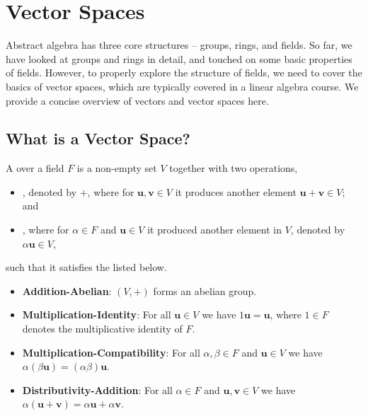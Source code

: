 \chapter{Vector Spaces}
Abstract algebra has three core structures -- groups, rings, and fields. So far, we have looked at groups and rings in detail, and touched on some basic properties of fields. However, to properly explore the structure of fields, we need to cover the basics of vector spaces, which are typically covered in a linear algebra course. We provide a concise overview of vectors and vector spaces here.

\section{What is a Vector Space?}
\begin{definition}
    A  over a field $F$ is a non-empty set $V$ together with two operations,
    \begin{itemize}
        \item {}, denoted by $+$, where for $\textbf{u}, \textbf{v} \in V$ it produces another element $\textbf{u} + \textbf{v} \in V$; and
        \item {}, where for $\alpha \in F$ and $\textbf{u} \in V$ it produced another element in $V$, denoted by $\alpha\textbf{u} \in V$,
    \end{itemize}
    such that it satisfies the  listed below.
    \begin{itemize}
        \item \textbf{Addition-Abelian}: $(V, +)$ forms an abelian group.

        \item \textbf{Multiplication-Identity}: For all $\textbf{u} \in V$ we have $1\textbf{u} = \textbf{u}$, where $1 \in F$ denotes the multiplicative identity of $F$.

        \item \textbf{Multiplication-Compatibility}: For all $\alpha,\beta \in F$ and $\textbf{u} \in V$ we have $\alpha(\beta\textbf{u}) = (\alpha\beta)\textbf{u}$.

        \item \textbf{Distributivity-Addition}: For all $\alpha \in F$ and $\textbf{u}, \textbf{v} \in V$ we have $\alpha(\textbf{u} + \textbf{v}) = \alpha\textbf{u} + \alpha\textbf{v}$.


\end{itemize}
\end{definition}
